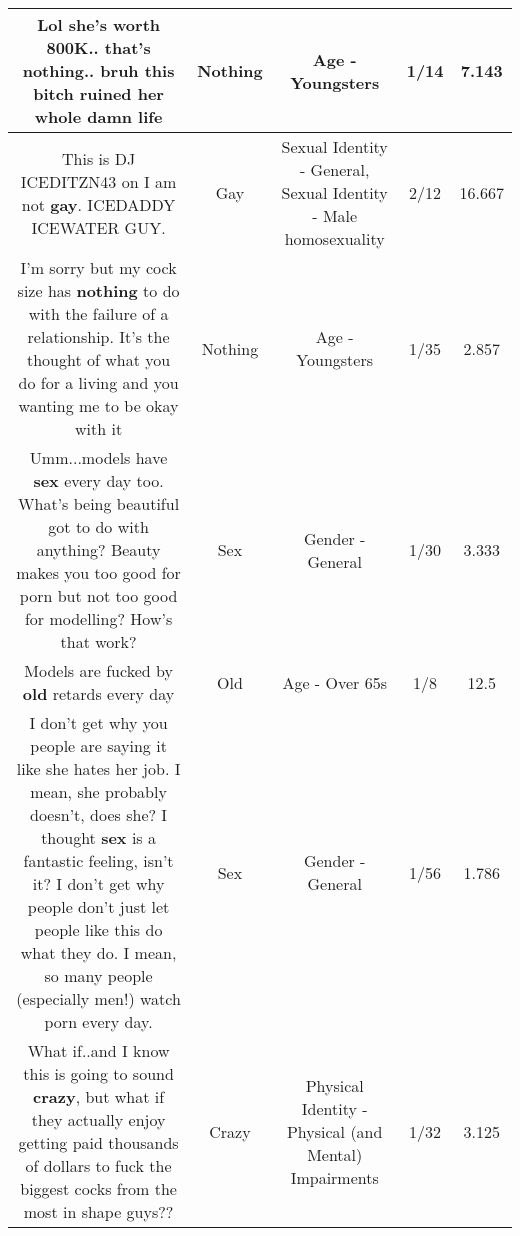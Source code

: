 \documentclass[11pt]{article}
\newlength\mylength
\begin{document}
\begin{center}
\begin{longtable}{|C{.65\mylength}|C{.30\mylength}|C{.12\mylength}|C{.12\mylength}|C{.12\mylength}|}
  \small Lol she's worth 800K.. that's  \textbf{nothing}.. bruh this bitch ruined her whole damn life\normalsize   & Nothing & Age - Youngsters & 1/14 & 7.143 \\  \hline
  \small This is DJ ICEDITZN43 on I    am not \textbf{g\textbf{ay}}. ICEDADDY ICEWATER GUY.\normalsize   & Gay & Sexual Identity - General, Sexual Identity - Male homosexuality & 2/12 & 16.667 \\  \hline
  \small I'm sorry but my cock size has \textbf{nothing} to do with the failure of a relationship. It's the thought of what you do for a living and you wanting me to be okay with it\normalsize   & Nothing & Age - Youngsters & 1/35 & 2.857 \\  \hline
  \small Umm...models have \textbf{sex} every day too. What's being beautiful got to do with anything? Beauty makes you too good for porn but not too good for modelling? How's that work?\normalsize   & Sex & Gender - General & 1/30 & 3.333 \\  \hline
  \small Models are fucked by \textbf{old} retards every day\normalsize   & Old & Age - Over 65s & 1/8 & 12.5 \\  \hline
  \small I don't get why you people are saying it like she hates her job. I mean, she probably doesn't, does she? I thought \textbf{sex} is a fantastic feeling, isn't it? I don't get why people don't just let people like this do what they do. I mean, so many people (especially men!) watch porn every day.\normalsize   & Sex & Gender - General & 1/56 & 1.786 \\  \hline
  \small What if..and I know this is going to sound \textbf{crazy}, but what if they actually enjoy getting paid thousands of dollars to fuck the biggest cocks from the most in shape guys??\normalsize   & Crazy & Physical Identity - Physical (and Mental) Impairments & 1/32 & 3.125 \\  \hline

\end{longtable}
\end{center}
\end{document}
